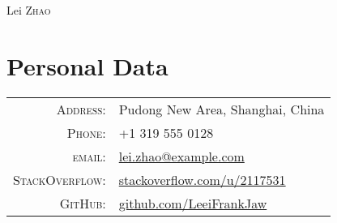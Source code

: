 \documentclass[a4paper,11pt]{article}
\begin{document}
\pagestyle{empty} %


\par{\centering
		{\Huge Lei \textsc{Zhao}
	}\bigskip\par}

\section{Personal Data}

\begin{tabular}{rl}
  \textsc{Address:}   & Pudong New Area, Shanghai, China \\
  \textsc{Phone:}     & +1 319 555 0128\\
  \textsc{email:}     & \href{mailto:lei.zhao@example.com}{\color{linkcolour}lei.zhao@example.com} \\
  \textsc{StackOverflow:} & \href{https://stackoverflow.com/users/2117531/lei-zhao}{\color{linkcolour}stackoverflow.com/u/2117531} \\
  \textsc{GitHub:} & \href{https://github.com/LeeiFrankJaw}{\color{linkcolour}github.com/LeeiFrankJaw}
\end{tabular}

\end{document}
